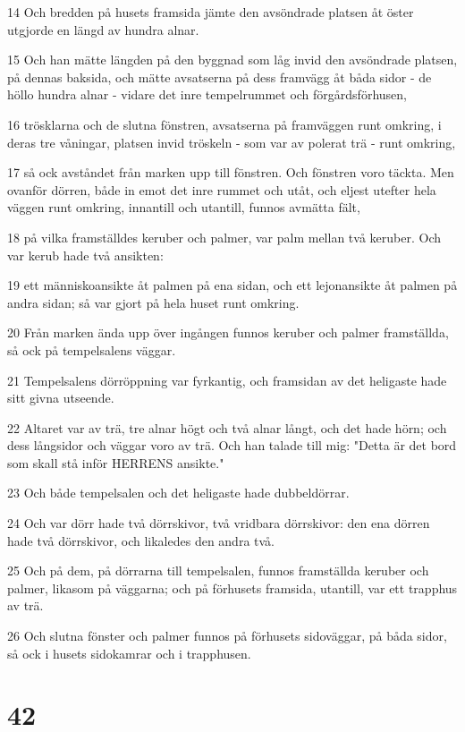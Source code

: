 \par 14 Och bredden på husets framsida jämte den avsöndrade platsen åt öster utgjorde en längd av hundra alnar.
\par 15 Och han mätte längden på den byggnad som låg invid den avsöndrade platsen, på dennas baksida, och mätte avsatserna på dess framvägg åt båda sidor - de höllo hundra alnar - vidare det inre tempelrummet och förgårdsförhusen,
\par 16 trösklarna och de slutna fönstren, avsatserna på framväggen runt omkring, i deras tre våningar, platsen invid tröskeln - som var av polerat trä - runt omkring,
\par 17 så ock avståndet från marken upp till fönstren. Och fönstren voro täckta. Men ovanför dörren, både in emot det inre rummet och utåt, och eljest utefter hela väggen runt omkring, innantill och utantill, funnos avmätta fält,
\par 18 på vilka framställdes keruber och palmer, var palm mellan två keruber. Och var kerub hade två ansikten:
\par 19 ett människoansikte åt palmen på ena sidan, och ett lejonansikte åt palmen på andra sidan; så var gjort på hela huset runt omkring.
\par 20 Från marken ända upp över ingången funnos keruber och palmer framställda, så ock på tempelsalens väggar.
\par 21 Tempelsalens dörröppning var fyrkantig, och framsidan av det heligaste hade sitt givna utseende.
\par 22 Altaret var av trä, tre alnar högt och två alnar långt, och det hade hörn; och dess långsidor och väggar voro av trä. Och han talade till mig: "Detta är det bord som skall stå inför HERRENS ansikte."
\par 23 Och både tempelsalen och det heligaste hade dubbeldörrar.
\par 24 Och var dörr hade två dörrskivor, två vridbara dörrskivor: den ena dörren hade två dörrskivor, och likaledes den andra två.
\par 25 Och på dem, på dörrarna till tempelsalen, funnos framställda keruber och palmer, likasom på väggarna; och på förhusets framsida, utantill, var ett trapphus av trä.
\par 26 Och slutna fönster och palmer funnos på förhusets sidoväggar, på båda sidor, så ock i husets sidokamrar och i trapphusen.

\chapter{42}

